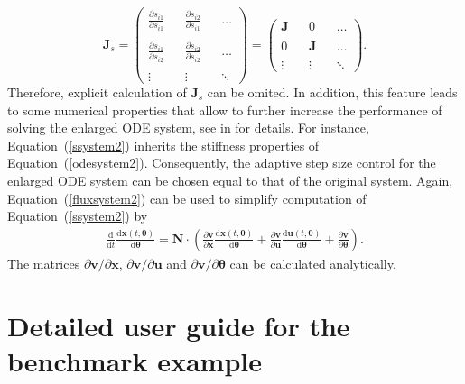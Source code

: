 \documentclass[12pt,a4paper]{scrartcl}
\newcommand{\dd}[2]{\frac{\partial #1}{\partial #2}}
\newcommand{\DD}[2]{\frac{\mathrm{d} #1}{\mathrm{d} #2}}
\begin{document}
\begin{displaymath}
\mathbf{J}_s = \left( 
\begin{array}{ccccc}
\dd{s_{i1}}{s_{i1}} & & \dd{s_{i2}}{s_{i1}} & & \ldots \\
\\
\dd{s_{i1}}{s_{i2}} & & \dd{s_{i2}}{s_{i2}}& & \ldots \\
\\
\vdots & & \vdots & & \ddots
\end{array} 
\right) = \left( 
\begin{array}{ccccc}
\mathbf{J} & & 0 & & \ldots \\
\\
0 & & \mathbf{J}& & \ldots \\
\\
\vdots & & \vdots & & \ddots
\end{array} 
\right).
\end{displaymath}
Therefore, explicit calculation of $\mathbf{J}_s$ can be omited. In addition, this feature 
leads to some numerical properties that allow to further increase the performance of 
solving the enlarged ODE system, see in \cite{Hindmarsh:2005fb} for details. For instance, 
Equation~(\ref{ssystem2}) inherits the stiffness properties of Equation~(\ref{odesystem2}). 
Consequently, the adaptive step size control for the enlarged ODE system can be chosen 
equal to that of the original system. Again, Equation~(\ref{fluxsystem2}) can be used to 
simplify computation of Equation~(\ref{ssystem2}) by 
\begin{eqnarray}
	\DD{}{t} \DD{\mathbf{x}(t,\boldsymbol{\theta})}{\boldsymbol{\theta}}  =  \mathbf{N}
\cdot \left(  \dd{\mathbf{v}}{\mathbf{x}}  \DD{\mathbf{x}(t,\boldsymbol{\theta})}
{\boldsymbol{\theta}} +  \dd{\mathbf{v}}{\mathbf{u}}  \DD{\mathbf{u}(t,\boldsymbol{\theta})}
{\boldsymbol{\theta}} + \dd{\mathbf{v}}{\boldsymbol{\theta}} \right). \label{ssystemflux}
\end{eqnarray}
The matrices $\partial{\mathbf{v}}/\partial{\mathbf{x}}$, $\partial{\mathbf{v}}/
\partial{\mathbf{u}}$ and $\partial{\mathbf{v}}/\partial{\boldsymbol{\theta}}$ can be 
calculated analytically.

\section{Detailed user guide for the \citet{Raia:2011vn} benchmark example} 
\label{user_guide}

\renewcommand{\bibname}{References}
\renewcommand{\bibfont}{\small}


\end{document}
